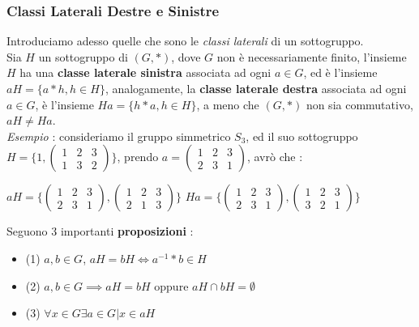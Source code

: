 \documentclass[12pt, letterpaper]{article}
\begin{document}
\subsubsection{Classi Laterali Destre e Sinistre} \label{classiLaterali}
 Introduciamo adesso quelle che sono le \textit{classi laterali} di un sottogruppo.\\
 Sia \(H\) un sottogruppo di \((G,*)\), dove \(G\) non è necessariamente finito, l'insieme 
 \(H\) ha una \textbf{classe laterale sinistra} associata ad ogni \(a\in G\), ed è l'insieme \(aH=\{a*h, h\in H\}\), 
 analogamente, la \textbf{classe laterale destra} associata ad ogni \(a\in G\),  è l'insieme \(Ha=\{h*a, h\in H\}\), 
 a meno che \((G,*)\) non sia commutativo, \(aH\ne Ha\). \\
 \textit{Esempio }: consideriamo il gruppo simmetrico \(S_3\), ed il suo sottogruppo \(H=\Bigg\{1,
 \begin{pmatrix}
    1 & 2 & 3\\
    1 & 3 & 2
    \end{pmatrix}
    \Bigg\}\), prendo \(a= \begin{pmatrix}
        1 & 2 & 3\\
        2 & 3 & 1
        \end{pmatrix}\), avrò che : \begin{center}
            \(
            aH=  \Bigg\{\begin{pmatrix}
                1 & 2 & 3\\
                2 & 3 & 1
                \end{pmatrix},
            \begin{pmatrix}
               1 & 2 & 3\\
               2 & 1 & 3
               \end{pmatrix}
               \Bigg\}  
            \) \hphantom{aaaaa} \(
            Ha=   \Bigg\{\begin{pmatrix}
                1 & 2 & 3\\
                2 & 3 & 1
                \end{pmatrix},
            \begin{pmatrix}
               1 & 2 & 3\\
               3 & 2 & 1
               \end{pmatrix}
               \Bigg\} 
            \)
        \end{center}
Seguono 3 importanti \textbf{proposizioni} : \begin{itemize}
    \item (1) \(a,b\in G\), \(aH=bH\iff a^{-1}*b\in H\)
    \item (2) \(a,b\in G\implies aH=bH \) oppure \(aH\cap bH =\emptyset\) 
    \item (3) \(\forall x \in G \exists a\in G | x\in aH\)
\end{itemize}
\end{document}
